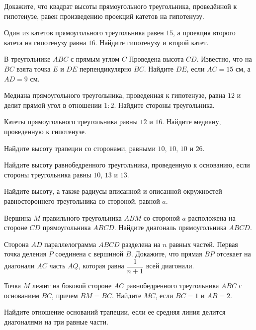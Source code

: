 \begin{class}[number=2]
	\begin{listofex}
		\item Докажите, что квадрат высоты прямоугольного треугольника, проведённой к гипотенузе, равен произведению проекций катетов на гипотенузу.
		\item Один из катетов прямоугольного треугольника равен \( 15 \), а проекция второго катета на гипотенузу равна \( 16 \). Найдите гипотенузу и второй катет.
		\item В треугольнике \( ABC \) с прямым углом \( C \) Проведена высота \( CD \). Известно, что на \( BC \) взята точка \( E \) и \( DE \) перпендикулярно \( BC \). Найдите \( DE \), если \( AC=15 \) см, а \( AD=9 \) см.	
		\item Медиана прямоугольного треугольника, проведенная к гипотенузе, равна \( 12 \) и делит прямой угол в отношении \( 1:2 \). Найдите стороны треугольника.
		\item Катеты прямоугольного треугольника равны \( 12 \) и \( 16 \). Найдите медиану, проведенную к гипотенузе.
		\item Найдите высоту трапеции со сторонами, равными \( 10 \), \( 10 \), \( 10 \) и \( 26 \).
		\item Найдите высоту равнобедренного треугольника, проведенную к основанию, если стороны треугольника равны \( 10 \), \( 13 \) и \( 13 \).
		\item Найдите высоту, а также радиусы вписанной и описанной окружностей равностороннего треугольника со стороной, равной \( a \).
		\item Вершина \( M \) правильного треугольника \( ABM \) со стороной \( a \) расположена на стороне \( CD \) прямоугольника \( ABCD \).	Найдите диагональ прямоугольника \( ABCD \).
	\end{listofex}
\end{class}

\begin{homework}[number=1]
	\begin{listofex}
		\item Сторона \( AD \) параллелограмма \( ABCD \) разделена на \( n \) равных частей. Первая точка деления \( P \) соединена с вершиной \( B \). Докажите, что прямая \( BP \) отсекает на диагонали \( AC \) часть \( AQ \), которая равна \( \dfrac{1}{n+1} \)	всей диагонали.
		\item Точка \( M \) лежит на боковой стороне \( AC \) равнобедренного треугольника \( ABC \) с основанием \( BC \), причем \( BM=BC \). Найдите \( MC \), если \( BC=1 \) и \( AB=2 \).
		\item Найдите отношение оснований трапеции, если ее	средняя линия делится диагоналями на три равные части.
	\end{listofex}
\end{homework}

